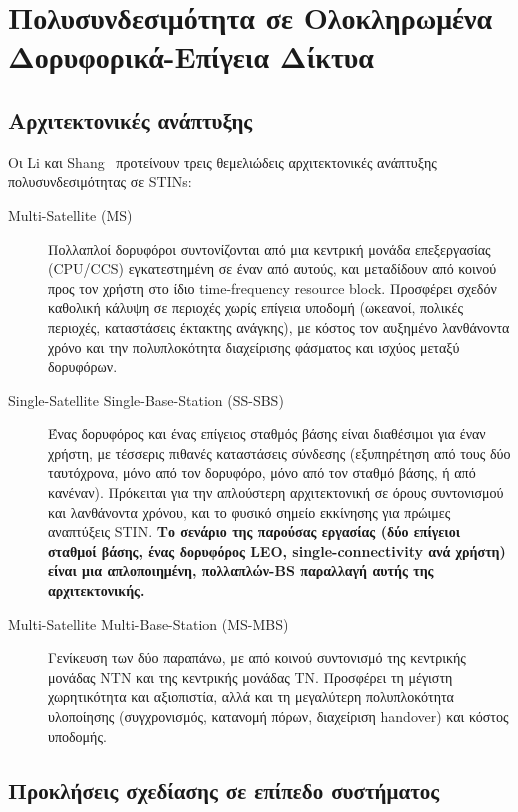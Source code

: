 \section{Πολυσυνδεσιμότητα σε Ολοκληρωμένα Δορυφορικά-Επίγεια Δίκτυα}
\label{sec:bg-mc-stin}

\subsection{Αρχιτεκτονικές ανάπτυξης}
\label{subsec:bg-architectures}

Οι Li και Shang~\cite{li2025advancing} προτείνουν τρεις θεμελιώδεις
αρχιτεκτονικές ανάπτυξης πολυσυνδεσιμότητας σε STINs:

\begin{description}
  \item[Multi-Satellite (MS)] Πολλαπλοί δορυφόροι συντονίζονται από μια
    κεντρική μονάδα επεξεργασίας (CPU/CCS) εγκατεστημένη σε έναν από
    αυτούς, και μεταδίδουν από κοινού προς τον χρήστη στο ίδιο
    time-frequency resource block. Προσφέρει σχεδόν καθολική κάλυψη σε
    περιοχές χωρίς επίγεια υποδομή (ωκεανοί, πολικές περιοχές, καταστάσεις
    έκτακτης ανάγκης), με κόστος τον αυξημένο λανθάνοντα χρόνο και την
    πολυπλοκότητα διαχείρισης φάσματος και ισχύος μεταξύ δορυφόρων.
  \item[Single-Satellite Single-Base-Station (SS-SBS)] Ένας δορυφόρος και
    ένας επίγειος σταθμός βάσης είναι διαθέσιμοι για έναν χρήστη, με
    τέσσερις πιθανές καταστάσεις σύνδεσης (εξυπηρέτηση από τους δύο
    ταυτόχρονα, μόνο από τον δορυφόρο, μόνο από τον σταθμό βάσης, ή από
    κανέναν). Πρόκειται για την απλούστερη αρχιτεκτονική σε όρους
    συντονισμού και λανθάνοντα χρόνου, και το φυσικό σημείο εκκίνησης για
    πρώιμες αναπτύξεις STIN. \textbf{Το σενάριο της παρούσας εργασίας
    (δύο επίγειοι σταθμοί βάσης, ένας δορυφόρος LEO, single-connectivity
    ανά χρήστη) είναι μια απλοποιημένη, πολλαπλών-BS παραλλαγή αυτής της
    αρχιτεκτονικής.}
  \item[Multi-Satellite Multi-Base-Station (MS-MBS)] Γενίκευση των δύο
    παραπάνω, με από κοινού συντονισμό της κεντρικής μονάδας NTN και της
    κεντρικής μονάδας TN. Προσφέρει τη μέγιστη χωρητικότητα και
    αξιοπιστία, αλλά και τη μεγαλύτερη πολυπλοκότητα υλοποίησης
    (συγχρονισμός, κατανομή πόρων, διαχείριση handover) και κόστος
    υποδομής.
\end{description}

\subsection{Προκλήσεις σχεδίασης σε επίπεδο συστήματος}
\label{subsec:bg-challenges}

